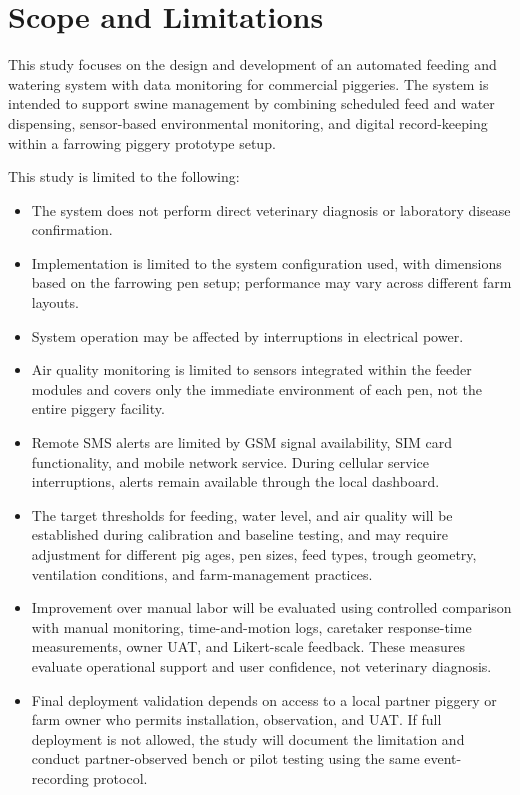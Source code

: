 \section{Scope and Limitations}

This study focuses on the design and development of an automated 
feeding and watering system with data monitoring for commercial 
piggeries. The system is intended to support swine management by 
combining scheduled feed and water dispensing, sensor-based 
environmental monitoring, and digital record-keeping within a 
farrowing piggery prototype setup.

\indent This study is limited to the following:
\begin{itemize}
    \item The system does not perform direct veterinary diagnosis 
    or laboratory disease confirmation.
    \item Implementation is limited to the system configuration used, with dimensions based on the farrowing pen setup; performance may vary across different farm layouts.
    \item System operation may be affected by interruptions in 
    electrical power.
    \item Air quality monitoring is limited to sensors integrated 
    within the feeder modules and covers only the immediate 
    environment of each pen, not the entire piggery facility.
    \item Remote SMS alerts are limited by GSM signal availability, SIM card functionality, and mobile network service. During cellular service interruptions, alerts remain available through the local dashboard.
    \item The target thresholds for feeding, water level, and air quality will be established during calibration and baseline testing, and may require adjustment for different pig ages, pen sizes, feed types, trough geometry, ventilation conditions, and farm-management practices.
    \item Improvement over manual labor will be evaluated using controlled comparison with manual monitoring, time-and-motion logs, caretaker response-time measurements, owner UAT, and Likert-scale feedback. These measures evaluate operational support and user confidence, not veterinary diagnosis.
    \item Final deployment validation depends on access to a local partner piggery or farm owner who permits installation, observation, and UAT. If full deployment is not allowed, the study will document the limitation and conduct partner-observed bench or pilot testing using the same event-recording protocol.
\end{itemize}
